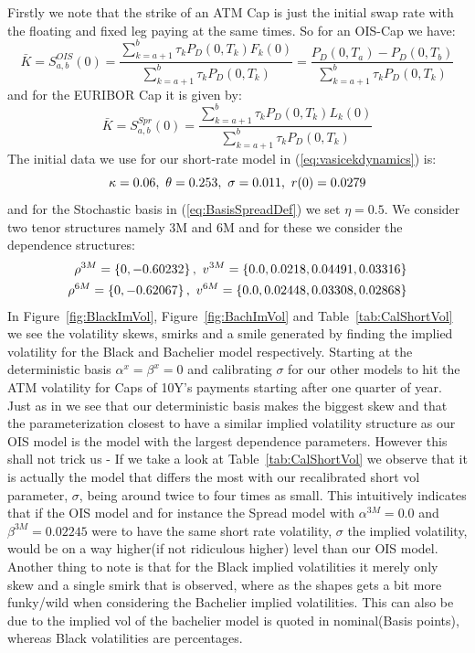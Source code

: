 \documentclass[12pt]{article}
\begin{document}
Firstly we note that the strike of an ATM Cap is
just the initial swap rate with the floating
and fixed leg paying at the same times.
So for an OIS-Cap we have:
\begin{equation}
    \bar K = S^{OIS}_{a , b}(0) = \frac{\sum_{k=a+1}^b\tau_k P_D(0,T_k)F_k(0)}
    {\sum_{k=a+1}^b\tau_k P_D(0,T_k)} = \frac{P_D(0,T_a) - P_D(0,T_b)}{\sum_{k=a+1}^b\tau_k P_D(0,T_k)}
\end{equation}
and for the EURIBOR Cap it is given by:
\begin{equation}
    \bar K = S^{Spr}_{a,b}(0) = \frac{\sum_{k=a+1}^b\tau_k P_D(0,T_k)L_k(0)}
    {\sum_{k=a+1}^b\tau_k P_D(0,T_k)}
\end{equation}
The initial data we use for our
short-rate model in (\ref{eq:vasicekdynamics}) is:
\begin{equation}
    \notag \kappa = 0.06,~   \theta = 0.253 ,~ \sigma = 0.011 ,~ r(0) = 0.0279
\end{equation}
and for the Stochastic basis in (\ref{eq:BasisSpreadDef}) we set $\eta = 0.5$.
We consider two tenor structures namely 3M and 6M and for
these we consider the dependence structures:
\begin{equation}\notag
    \begin{aligned}
        \rho^{3M} = \left\{ 0 , - 0.60232 \right\}, ~v^{3M} = \left\{ 0.0 , 0.0218 , 0.04491 , 0.03316 \right\} \\
        \rho^{6M} = \left\{ 0 , - 0.62067 \right\}, ~v^{6M} = \left\{ 0.0 , 0.02448 , 0.03308 , 0.02868 \right\}
    \end{aligned}
\end{equation}
In Figure~\ref{fig:BlackImVol},
Figure~\ref{fig:BachImVol} and Table~\ref{tab:CalShortVol}
we see the volatility skews, smirks and a smile generated
by finding the implied volatility for the Black and Bachelier
model respectively. Starting at the deterministic basis $\alpha ^x = \beta^x =0$
and calibrating $ \sigma$ for our other models to hit the ATM volatility for
Caps of 10Y's payments starting after one quarter of year.
Just as in \cite{MercXieStochBasis2012} we see
that our deterministic basis makes the biggest skew and that
the parameterization closest to have a similar implied volatility structure
as our OIS model is the model with the largest dependence parameters.
However this shall not trick us - If we take a look at Table~\ref{tab:CalShortVol}
we observe that it is actually the model that differs the most
with our recalibrated short vol parameter, $\sigma$,
being around twice to four times as small.
This intuitively indicates that if the OIS model and for instance
the Spread model with $\alpha^{3M} = 0.0$ and $\beta^{3M} = 0.02245$
were to have the same short rate volatility, $\sigma$ the implied volatility,
would be on a way higher(if not ridiculous higher) level than our OIS model.
Another thing to note is that for the Black implied volatilities
it merely only skew and a single smirk that is observed,
where as the shapes gets a bit more funky/wild when considering the Bachelier implied volatilities.
This can also be due to the implied vol of the bachelier model is quoted in nominal(Basis points),
whereas Black volatilities are percentages.\newline
\end{document}
